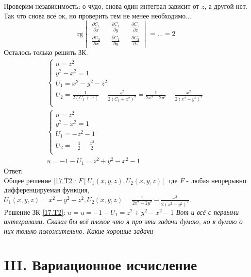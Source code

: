 \documentclass{article}
\newcommand{\rg}{\text{rg}}
\begin{document}
Проверим независимость: о чудо, снова один интеграл зависит от $z$, а другой нет. Так что снова всё ок, но проверить тем не менее необходимо...
\begin{equation*}
    \rg \begin{vmatrix}
        \frac{\partial C_1}{\partial x} && \frac{\partial C_1}{\partial y} && \frac{\partial C_1}{\partial z}\\
        \frac{\partial C_2}{\partial x} && \frac{\partial C_2}{\partial y} && \frac{\partial C_2}{\partial z}
    \end{vmatrix} = ... = 2
\end{equation*}
Осталось только решить ЗК.
\begin{gather*}
\begin{cases}
        u=z^2\\
        y^2-x^2=1\\
        U_1= x^2-y^2-z^2\\
        U_2=\frac{1}{2 \left(C_1+z^2\right)}-\frac{x^2}{2 \left(C_1+z^2\right)^2} = \frac{1}{2x^2-2y^2} - \frac{x^2}{2 \left(x^2-y^2\right)^2}\\
    \end{cases}    \\
    \begin{cases}
        u=z^2\\
        y^2-x^2=1\\
        U_1=-z^2-1\\
        U_2=- \frac{1}{2} - \frac{x^2}{2}\\
    \end{cases}    \\
    u=-1-U_1=z^2+y^2-x^2-1
\end{gather*}
Ответ:\\
 Oбщее решение \ref{17.T2}: $F[U_1(x,y,z),U_2(x,y,z)]$ где $F$ - любая непрерывно дифференцируемая функция, $U_1(x,y,z)=x^2-y^2-z^2, U_2(x,y,z)= \frac{1}{2x^2-2y^2} - \frac{x^2}{2 \left(x^2-y^2\right)^2}$.\\
 Pешение ЗК \ref{17.T2}: $u= u=-1-U_1=z^2+y^2-x^2-1$ 
  \textcolor[rgb]{0.480469,0.566406,0.480469}{\textit{Вот и всё с первыми интегралами. Сказал бы всё плохое что я про эти задачи думаю, но я думаю о них только положительно. Какие хорошие задачи}}                                               

\section{III. Вариационное исчисление}
\end{document}
